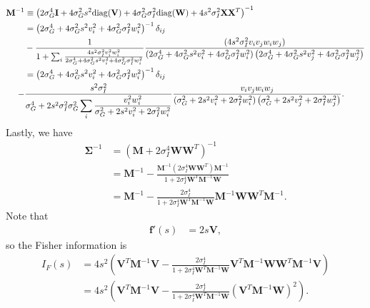 \documentclass[11pt]{article}
\begin{document}
	\begin{align}
	\mathbf{M}^{-1} &\equiv \left(2\sigma_G^4 \mathbf{I} +4\sigma_G^2 s^2 \text{diag}(\mathbf{V}) + 4\sigma_G^2 \sigma_I^2 \text{diag}(\mathbf{W}) + 4s^2 \sigma_I^2 \mathbf{X}\mathbf{X}^T\right)^{-1} \\
	&= \left(2\sigma_G^4 + 4\sigma_G^2 s^2 v_i^2 + 4\sigma_G^2 \sigma_I^2 w_i^2\right)^{-1}\delta_{ij} \notag \\
	& - \frac{1}{1 + \sum_i\frac{4s^2\sigma_I^2 v_i^2 w_i^2}{2\sigma_G^4 + 4\sigma_G^2 s^2 v_i^2 + 4\sigma_G^2 \sigma_I^2 w_i^2}}\frac{(4s^2 \sigma_I^2 v_i v_j w_i w_j)}{\left(2\sigma_G^4 + 4\sigma_G^2 s^2 v_i^2 + 4\sigma_G^2 \sigma_I^2 w_i^2\right)\left(2\sigma_G^4 + 4\sigma_G^2 s^2 v_j^2 + 4\sigma_G^2 \sigma_I^2 w_j^2\right)}\notag \\
	&= \left(2\sigma_G^4 + 4\sigma_G^2 s^2 v_i^2 + 4\sigma_G^2 \sigma_I^2 w_i^2\right)^{-1}\delta_{ij} \notag \\
	 - &\frac{s^2\sigma_I^2}{\sigma_G^4 +2s^2\sigma_I^2 \sigma_G^2\displaystyle\sum_i\frac{v_i^2 w_i^2}{\sigma_G^2+ 2s^2 v_i^2 + 2 \sigma_I^2 w_i^2}} \frac{ v_i v_j w_i w_j}{\left(\sigma_G^2 + 2s^2 v_i^2 + 2 \sigma_I^2 w_i^2\right)\left(\sigma_G^2 + 2 s^2 v_j^2 + 2\sigma_I^2 w_j^2\right)}.
	\end{align}
	Lastly, we have 
	\begin{align}
	\boldsymbol{\Sigma}^{-1} &= (\mathbf{M} + 2\sigma_I^4 \mathbf{W}\mathbf{W}^T)^{-1} \\
	&= \mathbf{M}^{-1} - \frac{\mathbf{M}^{-1} (2\sigma_I^4 \mathbf{W}\mathbf{W}^T) \mathbf{M}^{-1}}{1 + 2\sigma_I^4 \mathbf{W}^T\mathbf{M}^{-1}\mathbf{W}} \\
	&= \mathbf{M}^{-1} - \frac{2\sigma_I^4}{1 + 2\sigma_I^4 \mathbf{W}^T\mathbf{M}^{-1} \mathbf{W}} \mathbf{M}^{-1}\mathbf{W}\mathbf{W}^T\mathbf{M}^{-1}.
	\end{align}
	Note that
	\begin{align}
	\mathbf{f}'(s) &= 2 s \mathbf{V},
	\end{align}
	so the Fisher information is
	\begin{align}
	I_F(s) &= 4s^2 \left(\mathbf{V}^T \mathbf{M}^{-1} \mathbf{V} - \frac{2\sigma_I^4}{1 + 2\sigma_I^4 \mathbf{W}^T\mathbf{M}^{-1} \mathbf{W}} \mathbf{V}^T \mathbf{M}^{-1} \mathbf{W} \mathbf{W}^T \mathbf{M}^{-1}\mathbf{V}\right) \\
	&= 4s^2 \left(\mathbf{V}^T \mathbf{M}^{-1} \mathbf{V}-  \frac{2\sigma_I^4}{1 + 2\sigma_I^4 \mathbf{W}^T\mathbf{M}^{-1} \mathbf{W}} \left(\mathbf{V}^T\mathbf{M}^{-1} \mathbf{W}\right)^{2}\right).
	\end{align}
\end{document}
